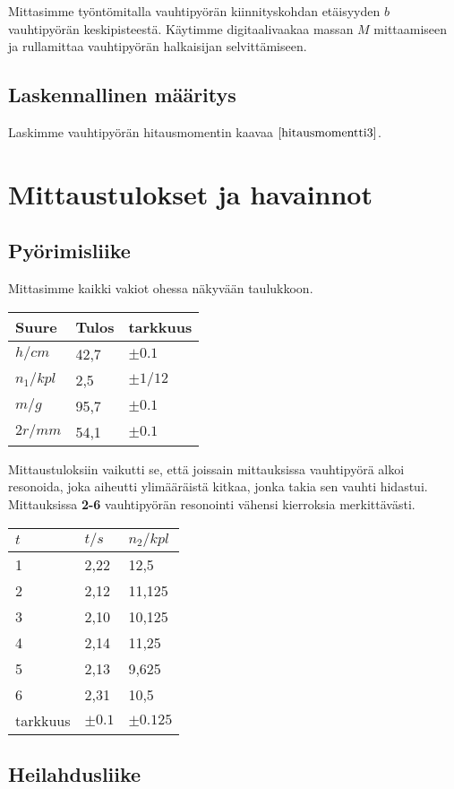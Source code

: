 \documentclass[]{article}
\begin{document}
Mittasimme työntömitalla vauhtipyörän kiinnityskohdan etäisyyden \(b\)
vauhtipyörän keskipisteestä. Käytimme digitaalivaakaa massan \(M\)
mittaamiseen ja rullamittaa vauhtipyörän halkaisijan selvittämiseen.

\subsection{Laskennallinen määritys}\label{laskennallinen-maaritys}

Laskimme vauhtipyörän hitausmomentin kaavaa \(\eqref{hitausmomentti3}\).

\section{Mittaustulokset ja
havainnot}\label{mittaustulokset-ja-havainnot}

\subsection{Pyörimisliike}\label{pyorimisliike-1}

Mittasimme kaikki vakiot ohessa näkyvään taulukkoon.

\begin{longtable}[]{@{}lll@{}}
\toprule
Suure & Tulos & tarkkuus\tabularnewline
\midrule
\endhead
\(h/cm\) & 42,7 & \(\pm0.1\)\tabularnewline
\(n_1/kpl\) & 2,5 & \(\pm1/12\)\tabularnewline
\(m/g\) & 95,7 & \(\pm0.1\)\tabularnewline
\(2r/mm\) & 54,1 & \(\pm0.1\)\tabularnewline
\bottomrule
\end{longtable}

Mittaustuloksiin vaikutti se, että joissain mittauksissa vauhtipyörä
alkoi resonoida, joka aiheutti ylimääräistä kitkaa, jonka takia sen
vauhti hidastui. Mittauksissa \textbf{2-6} vauhtipyörän resonointi
vähensi kierroksia merkittävästi.

\begin{longtable}[]{@{}lll@{}}
\toprule
\(t\) & \(t/s\) & \(n_2/kpl\)\tabularnewline
\midrule
\endhead
1 & 2,22 & 12,5\tabularnewline
2 & 2,12 & 11,125\tabularnewline
3 & 2,10 & 10,125\tabularnewline
4 & 2,14 & 11,25\tabularnewline
5 & 2,13 & 9,625\tabularnewline
6 & 2,31 & 10,5\tabularnewline
tarkkuus & \(\pm0.1\) & \(\pm0.125\)\tabularnewline
\bottomrule
\end{longtable}

\newpage

\subsection{Heilahdusliike}\label{heilahdusliike-1}
\end{document}
